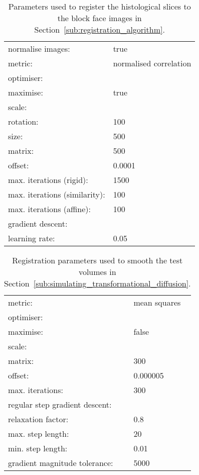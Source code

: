   \begin{table}[h]
    \centering
    \begin{tabular}{|ll|}
      \hline
      normalise images: & true \\
      metric: & normalised correlation \\
      \multicolumn{2}{|l|}{optimiser:} \\
      \quad maximise: & true \\
      \multicolumn{2}{|l|}{\quad scale:} \\
      \quad\quad rotation: & 100 \\
      \quad\quad size: & 500 \\
      \quad\quad matrix: & 500 \\
      \quad\quad offset: & 0.0001 \\
      \quad max. iterations (rigid): & 1500 \\
      \quad max. iterations (similarity): & 100 \\
      \quad max. iterations (affine): & 100 \\
      \multicolumn{2}{|l|}{\quad gradient descent:} \\
      \quad\quad learning rate: & 0.05 \\
      \hline
    \end{tabular}
    
    \caption{Parameters used to register the histological slices to the block face images in Section~\ref{sub:registration_algorithm}.}
    \label{tab:block_face_to_histo}
  \end{table}
  
  \begin{table}[h]
    \centering
    \begin{tabular}{|ll|}
      \hline
      metric: & mean squares \\
      \multicolumn{2}{|l|}{optimiser:} \\
      \quad maximise: & false\\
      \multicolumn{2}{|l|}{\quad scale:} \\
      \quad\quad matrix: & 300 \\
      \quad\quad offset: & 0.000005 \\
      \quad max. iterations: & 300 \\
      \multicolumn{2}{|l|}{\quad regular step gradient descent:} \\
      \quad\quad relaxation factor: & 0.8 \\
      \quad\quad max. step length: & 20 \\
      \quad\quad min. step length: & 0.01 \\
      \quad\quad gradient magnitude tolerance: & 5000 \\
      \hline
    \end{tabular}
    
    \caption{Registration parameters used to smooth the test volumes in Section~\ref{sub:simulating_transformational_diffusion}.}
    \label{tab:dummy_histo_to_histo}
  \end{table}
  
